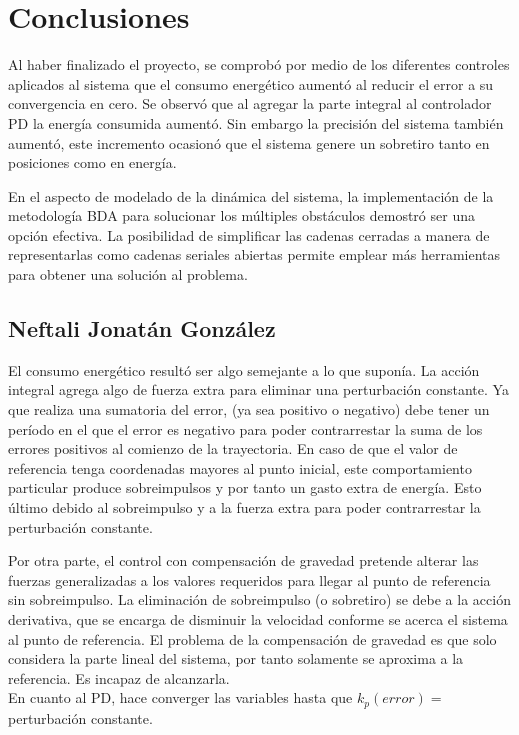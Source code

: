 \section{Conclusiones}
Al haber finalizado el proyecto, se comprobó por medio de los diferentes controles aplicados al sistema que el consumo energético aumentó al reducir el error a su convergencia en cero. 
Se observó que al agregar la parte integral al controlador PD la energía consumida aumentó. Sin embargo la precisión del sistema también aumentó, este incremento ocasionó que el sistema genere un sobretiro tanto en posiciones como en energía.

En el aspecto de modelado de la dinámica del sistema, la implementación de la metodología BDA para solucionar los múltiples obstáculos demostró ser una opción efectiva.
La posibilidad de simplificar las cadenas cerradas a manera de representarlas como cadenas seriales abiertas permite emplear más herramientas para obtener una solución al problema.



\subsection{Neftali Jonatán González}
El consumo energético resultó ser algo semejante a lo que suponía. La acción integral agrega algo de fuerza extra para eliminar una perturbación constante.
Ya que realiza una sumatoria del error, (ya sea positivo o negativo) debe tener un período en el que el error es negativo para poder contrarrestar la suma de los errores positivos al comienzo de la trayectoria.
En caso de que el valor de referencia tenga coordenadas mayores al punto inicial, este comportamiento particular produce sobreimpulsos y por tanto un gasto extra de energía. 
Esto último debido al sobreimpulso y a la fuerza extra para poder contrarrestar la perturbación constante.

Por otra parte, el control con compensación de gravedad pretende alterar las fuerzas generalizadas a los valores requeridos para llegar al punto de referencia sin sobreimpulso.
La eliminación de sobreimpulso (o sobretiro) se debe a la acción derivativa, que se encarga de disminuir la velocidad conforme se acerca el sistema al punto de referencia.
El problema de la compensación de gravedad es que solo considera la parte lineal del sistema, por tanto solamente se aproxima a la referencia. Es incapaz de alcanzarla.\\

En cuanto al PD, hace converger las variables hasta que $k_p\left(error\right) = $perturbación constante.

